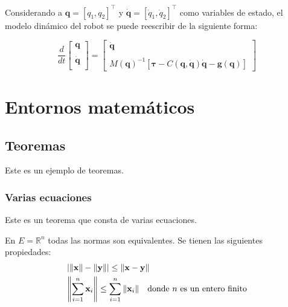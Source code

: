 Considerando a $\mathbf{q}=[q_{1}, q_{2}]^{\top}$ y $\dot{\mathbf{q}}=[\dot{q}_{1}, \dot{q}_{2}]^{\top}$ como variables de estado, el modelo dinámico del robot se puede reescribir de la siguiente forma:

\begin{equation}
	\frac{d}{dt}
	\begin{bmatrix}
		\mathbf{q}\\
		\\
		\dot{\mathbf{q}}\\
	\end{bmatrix}
	=
	\begin{bmatrix}
		\dot{\mathbf{q}}\\
		\\
		M(\mathbf{q})^{-1}\left[\mathbf{\tau} - C(\mathbf{q}, \dot{\mathbf{q}})\dot{\mathbf{q}} - \mathbf{g}(\mathbf{q})\right] 
	\end{bmatrix}
\end{equation}


\section{Entornos matemáticos}

\subsection{Teoremas}

Este es un ejemplo de teoremas.

\subsubsection{Varias ecuaciones}
Este es un teorema que consta de varias ecuaciones.

\begin{theorem}
	En $E=\mathbb{R}^n$ todas las normas son equivalentes. Se tienen las siguientes propiedades:
	\begin{align}
		& \abs{\norm{\mathbf{x}} - \norm{\mathbf{y}}} \leq \norm{\mathbf{x}- \mathbf{y}}\\
		&  \norm{\sum_{i=1}^n\mathbf{x}_i}\leq \sum_{i=1}^n\norm{\mathbf{x}_i}\quad\text{donde $n$ es un entero finito}
	\end{align}
\end{theorem}

